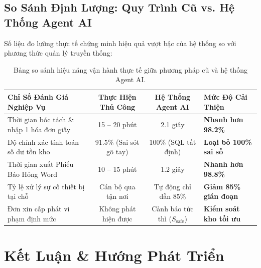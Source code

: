 \documentclass[11pt,a4paper]{article}
\begin{document}
\subsection{So Sánh Định Lượng: Quy Trình Cũ vs. Hệ Thống Agent AI}
Số liệu đo lường thực tế chứng minh hiệu quả vượt bậc của hệ thống so với phương thức quản lý truyền thống:

\begin{table}[H]
\centering
\small
\renewcommand{\arraystretch}{1.25}
\begin{tabularx}{\textwidth}{p{4.8cm} c c >{\raggedright\arraybackslash}X}
\toprule
\textbf{Chỉ Số Đánh Giá Nghiệp Vụ} & \textbf{Thực Hiện Thủ Công} & \textbf{Hệ Thống Agent AI} & \textbf{Mức Độ Cải Thiện} \\
\midrule
Thời gian bóc tách \& nhập 1 hóa đơn giấy & 15 -- 20 phút & 2.1 giây & \textbf{Nhanh hơn 98.2\%} \\
Độ chính xác tính toán số dư tồn kho & 91.5\% (Sai sót gõ tay) & 100\% (SQL tất định) & \textbf{Loại bỏ 100\% sai số} \\
Thời gian xuất Phiếu Báo Hỏng Word & 10 -- 15 phút & 1.2 giây & \textbf{Nhanh hơn 98.8\%} \\
Tỷ lệ xử lý sự cố thiết bị tại chỗ & Cán bộ qua tận nơi & Tự động chỉ dẫn 85\% & \textbf{Giảm 85\% gián đoạn} \\
Đơn xin cấp phát vi phạm định mức & Không phát hiện được & Cảnh báo tức thì ($S_{\text{safe}}$) & \textbf{Kiểm soát kho tối ưu} \\
\bottomrule
\end{tabularx}
\caption{Bảng so sánh hiệu năng vận hành thực tế giữa phương pháp cũ và hệ thống Agent AI.}
\end{table}

\newpage

\section{Kết Luận \& Hướng Phát Triển}
\end{document}
